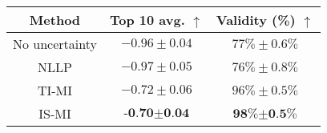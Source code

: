 \begin{tabular}{ccc}
\toprule
\textbf{Method} & \textbf{Top 10 avg.} $\uparrow$ & \textbf{Validity (\%)} $\uparrow$ \\
\toprule
No uncertainty & $-0.96\pm 0.04$ & $77\% \pm 0.6\%$\\
NLLP & $-0.97 \pm 0.05$& $76\%\pm 0.8\%$ \\
TI-MI & $-0.72\pm 0.06$ & $96 \% \pm 0.5\%$\\
IS-MI & $\textbf{-0.70}\pm \textbf{0.04}$ & $\textbf{98\%} \pm \textbf{0.5\%}$\\
\bottomrule
\end{tabular}
